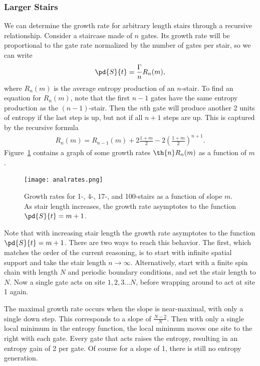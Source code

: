 \subsubsection{Larger Stairs}  \label{subsub:largestairs}

We can determine the growth rate for arbitrary length stairs through a recursive relationship. Consider a staircase made of $n$ gates. Its growth rate will be proportional to the gate rate normalized by the number of gates per stair, so we can write
\begin{align}
\pd{S}{t} = \frac{\Gamma}{n}R_n(m), \label{eqn:growthrate}
\end{align}
where $R_n(m)$ is the average entropy production of an $n$-stair. To find an equation for $R_n(m)$, note that the first $n-1$ gates have the same entropy production as the $(n-1)$-stair. Then the $n$th gate will produce another 2 units of entropy if the last step is up, but not if all $n+1$ steps are up. This is captured by the recursive formula
\begin{align}
R_n(m) = R_{n-1}(m)+2\frac{1+m}{2} - 2\left(\frac{1+m}{2}\right)^{n+1}. \label{eqn:raterecur}
\end{align}
Figure~\ref{fig:growthrates} contains a graph of some growth rates $\th{n}R_n(m)$ as a function of $m$.

\begin{figure}
	\centering
	\texttt{[image: analrates.png]}
	\caption{Growth rates for 1-, 4-, 17-, and 100-stairs as a function of slope $m$. As stair length increases, the growth rate asymptotes to the function $\pd{S}{t} = m+1$.}
	\label{fig:growthrates}
\end{figure}

Note that with increasing stair length the growth rate asymptotes to the function $\pd{S}{t} = m+1$. There are two ways to reach this behavior. The first, which matches the order of the current reasoning, is to start with infinite spatial support and take the stair length $n\to\infty$. Alternatively, start with a finite spin chain with length $N$ and periodic boundary conditions, and set the stair length to $N$. Now a single gate acts on site $1,2,3\dots N$, before wrapping around to act at site 1 again. 

The maximal growth rate occurs when the slope is near-maximal, with only a single down step. This corresponds to a slope of $\frac{N-2}{N}$. Then with only a single local minimum in the entropy function, the local minimum moves one site to the right with each gate. Every gate that acts raises the entropy, resulting in an entropy gain of 2 per gate. Of course for a slope of 1, there is still no entropy generation.

